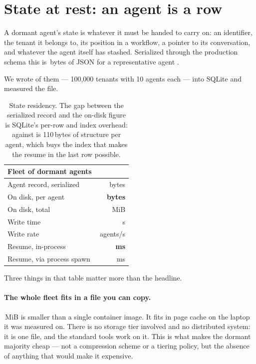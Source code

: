 \section{State at rest: an agent is a row}
\label{sec:state}

A dormant agent's state is whatever it must be handed to carry on: an
identifier, the tenant it belongs to, its position in a workflow, a pointer to
its conversation, and whatever the agent itself has stashed. Serialized through
the production schema this is \rFleetRecord{}\,bytes of JSON for a representative
agent \meas{}.

We wrote \rFleetAgents{} of them --- 100{,}000 tenants with 10 agents each ---
into SQLite and measured the file.

\begin{table}[h]
\centering
\begin{tabular}{lr}
\toprule
\textbf{Fleet of \rFleetAgents{} dormant agents} & \\
\midrule
Agent record, serialized       & \rFleetRecord{}\,bytes \meas{} \\
On disk, per agent             & \textbf{\rFleetPer{}\,bytes} \meas{} \\
On disk, total                 & \rFleetDisk{}\,MiB \meas{} \\
Write time                     & \rFleetWriteS{}\,s \meas{} \\
Write rate                     & \rFleetRate{}\,agents/s \meas{} \\
Resume, in-process             & \textbf{\rFleetResume{}\,ms} \meas{} \\
Resume, via process spawn      & \rFleetResumeCold{}\,ms \meas{} \\
\bottomrule
\end{tabular}
\caption{State residency. The gap between the serialized record and the on-disk
figure is SQLite's per-row and index overhead: \rFleetPer{} against
\rFleetRecord{} is 110\,bytes of structure per agent, which buys the index that
makes the resume in the last row possible.}
\label{tab:fleet}
\end{table}

Three things in that table matter more than the headline.

\paragraph{The whole fleet fits in a file you can copy.}
\rFleetDisk{}\,MiB is smaller than a single container image. It fits in page
cache on the laptop it was measured on. There is no storage tier involved and no
distributed system: it is one file, and the standard tools work on it. This is
what makes the dormant majority cheap --- not a compression scheme or a tiering
policy, but the absence of anything that would make it expensive.

